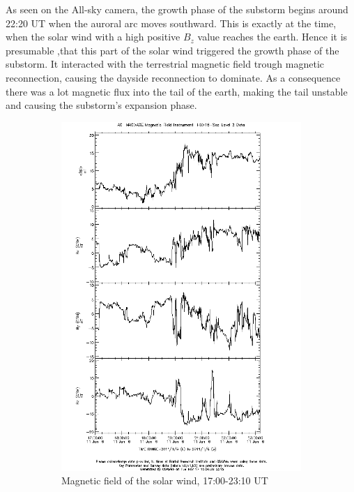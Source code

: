 \documentclass[10pt,a4paper]{article}
\begin{document}
As seen on the All-sky camera, the growth phase of the substorm begins around 22:20 UT when the auroral arc moves southward. This is exactly at the time, when the solar wind with a high positive $B_z$ value reaches the earth. Hence it is presumable ,that this part of the solar wind triggered the growth phase of the substorm. It interacted with the terrestrial magnetic field trough magnetic reconnection, causing the dayside reconnection to dominate. As a consequence there was a lot magnetic flux into the tail of the earth, making the tail unstable and causing the substorm's expansion phase.







\begin{figure}[h]
	\begin{subfigure}[h]{.5\textwidth}
		\centering
		\includegraphics[width=.8\linewidth]{ace-17-2310-b.png}
		\caption{Magnetic field of the solar wind, 17:00-23:10 UT}
		\label{ace1}
	\end{subfigure}
	\begin{subfigure}[h]{.5\textwidth}
		\centering

\end{subfigure}
\end{figure}
\end{document}
